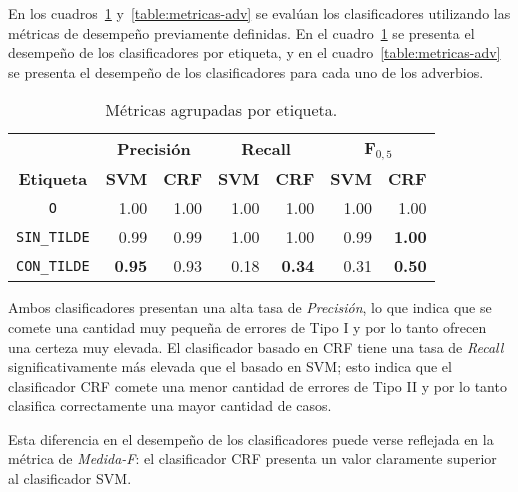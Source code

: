 \documentclass[runningheads,a4paper]{llncs}
\begin{document}
En los cuadros~\ref{table:metricas-generales} y~\ref{table:metricas-adv} se evalúan los clasificadores utilizando las métricas de desempeño previamente definidas. En el cuadro~\ref{table:metricas-generales} se presenta el desempeño de los clasificadores por etiqueta, y en el cuadro~\ref{table:metricas-adv} se presenta el desempeño de los clasificadores para cada uno de los adverbios.

\begin{table}[ht]
 	\renewcommand{\arraystretch}{1.3}
	\renewcommand{\tabcolsep}{3pt}
	\caption{Métricas agrupadas por etiqueta.}
	\label{table:metricas-generales}
	\centering
	\begin{tabular}{c r r r r r r}
		\hline
		\multicolumn{1}{c}{} 
			& \multicolumn{2}{c}{\textbf{Precisión}} 
			& \multicolumn{2}{c}{\textbf{Recall}} 
			& \multicolumn{2}{c}{\textbf{F$_{0,5}$}} \\
		\multicolumn{1}{c}{\textbf{Etiqueta}} 
			& \multicolumn{1}{r}{\textbf{SVM}} & \multicolumn{1}{r}{\textbf{CRF}}
			& \multicolumn{1}{r}{\textbf{SVM}} & \multicolumn{1}{r}{\textbf{CRF}}
			& \multicolumn{1}{r}{\textbf{SVM}} & \multicolumn{1}{r}{\textbf{CRF}} \\
		\hline\hline
		\texttt{O} 				& 1.00 	& 1.00			& 1.00 & 1.00 			& 1.00 & 1.00 \\
		\texttt{SIN\_TILDE} 	& 0.99 & 0.99 			& 1.00 & 1.00 			& 0.99 & \textbf{1.00} \\
		\texttt{CON\_TILDE} 	& \textbf{0.95} & 0.93 	& 0.18 & \textbf{0.34} 	& 0.31 & \textbf{0.50} \\
		\hline
	\end{tabular}
\end{table}

Ambos clasificadores presentan una alta tasa de \emph{Precisión}, lo que indica que se comete una cantidad muy pequeña de errores de Tipo I y por lo tanto ofrecen una certeza muy elevada. El clasificador basado en CRF tiene una tasa de  \emph{Recall} significativamente más elevada que el basado en SVM; esto indica que el clasificador CRF comete una menor cantidad de errores de Tipo II y por lo tanto clasifica correctamente una mayor cantidad de casos. 

Esta diferencia en el desempeño de los clasificadores puede verse reflejada en la métrica de  \emph{Medida-F}: el clasificador CRF presenta un valor  claramente superior al clasificador SVM.
\end{document}
